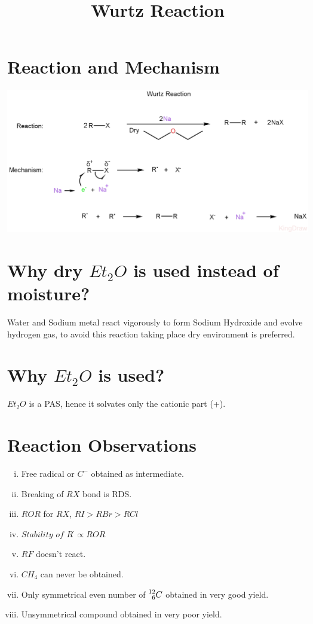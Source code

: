 \documentclass{article}
\title{Wurtz Reaction}
\author{}
\date{}
\begin{document}
\maketitle
\section{Reaction and Mechanism}
\begin{center}

    \includegraphics[scale=0.25]{WurtzReaction(1)_1722164749564.JPEG}
\end{center}

\section{Why dry $Et_{2}O$ is used instead of moisture?}
Water and Sodium metal react vigorously to form Sodium Hydroxide and evolve hydrogen gas, to avoid this reaction taking place dry environment is preferred.
\section{Why $Et_{2}O$ is used?}
$Et_{2}O$ is a PAS, hence it solvates only the cationic part (+).

\section{Reaction Observations}
\begin{enumerate}[i.]
    \item Free radical or $C^-$ obtained as intermediate.
    \item Breaking of $RX$ bond is RDS.
    \item $ROR$ for $RX$, $RI > RBr> RCl$
    \item $\textit{Stability of } R^\cdot \propto ROR $
    \item $RF$ doesn't react.
    \item $CH_{4}$ can never be obtained.
    \item Only symmetrical even number of $\prescript{12}{6}{C}$ obtained in very good yield.
    \item Unsymmetrical compound obtained in very poor yield.
\end{enumerate}
\end{document}
